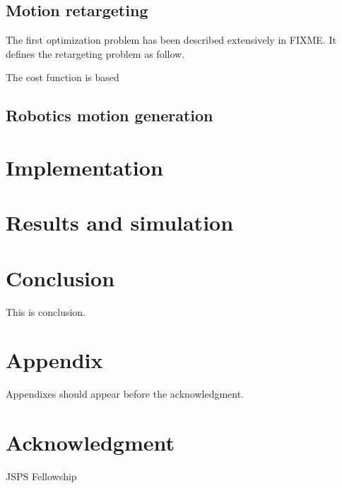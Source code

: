 \documentclass[letterpaper, 10 pt, conference]{ieeeconf}  %
\begin{document}
\subsection{Motion retargeting}


The first optimization problem has been described extensively in
FIXME. It defines the retargeting problem as follow.

The cost function is based


\subsection{Robotics motion generation}

\section{Implementation}
\label{sec:implementation}


\section{Results and simulation}
\label{sec:results}

\section{Conclusion}
\label{sec:conclusion}

This is conclusion.








\section*{Appendix}

Appendixes should appear before the acknowledgment.

\section*{Acknowledgment}

JSPS Fellowship





\end{document}

